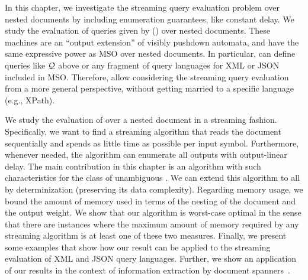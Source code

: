 In this chapter, we investigate the streaming query evaluation problem over nested documents by including enumeration guarantees, like constant delay. We study the evaluation of queries given by \vpannnames (\vpanns) over nested documents.  These machines are an ``output extension'' of visibly pushdown automata, %
{and have the same expressive power as MSO over nested documents. 
In particular, \vpanns can define queries like $\mathcal{Q}$ above or any fragment of query languages for XML or JSON included in MSO.}
Therefore, \vpanns allow considering the streaming query evaluation from a more general perspective, without getting married to a specific language (e.g., XPath). 

We study the evaluation of \vpann over a nested document in a streaming fashion. Specifically, we want to find a streaming algorithm that reads the document sequentially and spends as little time as possible per input symbol. 
Furthermore, whenever needed, the algorithm can enumerate all outputs with output-linear delay. %
The main contribution in this chapter is an algorithm with such characteristics for the class of unambiguous \vpanns. We can extend this algorithm to all \vpanns by determinization (preserving its data complexity). 
Regarding memory usage, we bound the amount of memory used in terms of the nesting of the document and the output weight. We show that our algorithm is worst-case optimal in the sense that there are instances where the maximum amount of memory required by any streaming algorithm is at least one of these two measures.
Finally, we present some examples that show how our result can be applied to the streaming evaluation of XML and JSON query languages.
Further, we show an application of our results in the context of information extraction by document spanners~\cite{FaginKRV15}.


